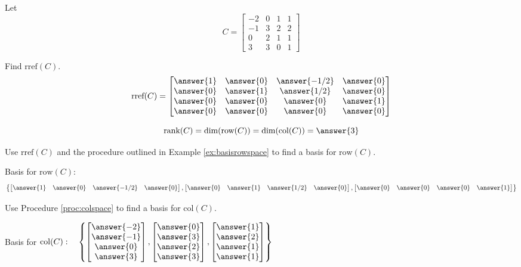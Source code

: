 \documentclass{ximera}
\begin{document}
\begin{problem}
Let
$$C=\begin{bmatrix}-2&0&1&1\\-1&3&2&2\\0&2&1&1\\3&3&0&1\end{bmatrix}$$ 

\begin{problem}\label{prob:colrowmatrixC1}
Find $\mbox{rref}(C)$.
$$\mbox{rref}(C)=\begin{bmatrix}\answer{1}&\answer{0}&\answer{-1/2}&\answer{0}\\\answer{0}&\answer{1}&\answer{1/2}&\answer{0}\\\answer{0}&\answer{0}&\answer{0}&\answer{1}\\\answer{0}&\answer{0}&\answer{0}&\answer{0}\end{bmatrix}$$
\end{problem}

\begin{problem}\label{prob:colrowmatrixC2}
$$\mbox{rank}(C)=\mbox{dim}(\mbox{row}(C))=\mbox{dim}(\mbox{col}(C))=\answer{3}$$
\end{problem}

\begin{problem}\label{prob:colrowmatrixC3}
Use $\mbox{rref}(C)$ and the procedure outlined in Example \ref{ex:basisrowspace} to find a basis for $\mbox{row}(C)$.

Basis for $\mbox{row}(C):$
$$\left\{\begin{bmatrix}\answer{1}& \answer{0}& \answer{-1/2}&\answer{0}\end{bmatrix},\begin{bmatrix}\answer{0} & \answer{1}& \answer{1/2}&\answer{0}\end{bmatrix}, \begin{bmatrix}\answer{0}&\answer{0}&\answer{0}&\answer{1}\end{bmatrix} \right\}$$
\end{problem}

\begin{problem}\label{prob:colrowmatrixC4}
Use Procedure \ref{proc:colspace} to find a basis for $\mbox{col}(C)$.

Basis for $\mbox{col}(C):\quad
\left\{ \begin{bmatrix}\answer{-2}\\\answer{-1}\\\answer{0}\\\answer{3}\end{bmatrix}, \begin{bmatrix}\answer{0}\\\answer{3}\\\answer{2}\\\answer{3}\end{bmatrix}, \begin{bmatrix}\answer{1}\\\answer{2}\\\answer{1}\\\answer{1}\end{bmatrix}\right\}$
\end{problem}


\end{problem}
\end{document}

